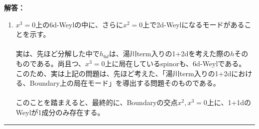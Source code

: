 \documentclass[dvipdfmx,a4paper,10.5pt]{article}
\numberwithin{equation}{section}
\newenvironment{answerbox}
{\begin{prooflabel}\textbf{解答：}\end{prooflabel}\vspace{0.8em}}
{\par\vspace{1em}\hrule\vspace{1em}}
\begin{document}
\begin{answerbox}
\begin{enumerate}
        \item $x^{3}=0$上の6d-Weylの中に、さらに$x^{2}=0$上で2d-Weylになるモードがあることを示す。\\
        \\
        実は、先ほど分解した中で$h_{6d}$は、湯川term入りの1+2dを考えた際の$h$そのものである。尚且つ、$x^{3}=0$上に局在しているspinorも、6d-Weylである。\\
        このため、実は上記の問題は、先ほど考えた、「湯川term入りの1+2dにおける、Boundary上の局在モード」を導出する問題そのものである。\\
        \\
        このことを踏まえると、最終的に、Boundaryの交点$x^{2},x^{3}=0$上に、1+1dのWeylが1成分のみ存在する。
    \end{enumerate}
\end{answerbox}
\end{document}

